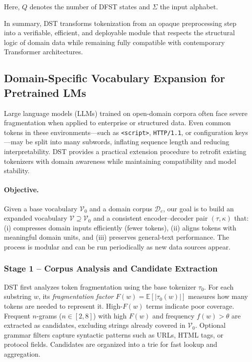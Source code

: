 Here, $Q$ denotes the number of DFST states and $\Sigma$ the input alphabet.

In summary, DST transforms tokenization from an opaque preprocessing step into a verifiable, efficient, and deployable module that respects the structural logic of domain data while remaining fully compatible with contemporary Transformer architectures.

\subsection{Domain-Specific Vocabulary Expansion for Pretrained LMs}
\label{sec:method-dsv}

Large language models (LLMs) trained on open-domain corpora often face severe fragmentation when applied to enterprise or structured data.
Even common tokens in these environments—such as \texttt{<script>}, \texttt{HTTP/1.1}, or configuration keys—may be split into many subwords, inflating sequence length and reducing interpretability.
DST provides a practical extension procedure to retrofit existing tokenizers with domain awareness while maintaining compatibility and model stability.

\paragraph{Objective.}
Given a base vocabulary $\mathcal{V}_0$ and a domain corpus $\mathcal{D}_e$,
our goal is to build an expanded vocabulary $\mathcal{V}\!\supseteq\!\mathcal{V}_0$ and a consistent encoder–decoder pair $(\tau,\kappa)$ that:
(i) compresses domain inputs efficiently (fewer tokens),
(ii) aligns tokens with meaningful domain units, and
(iii) preserves general-text performance.
The process is modular and can be run periodically as new data sources appear.

\subsubsection{Stage 1 – Corpus Analysis and Candidate Extraction}

DST first analyzes token fragmentation using the base tokenizer $\tau_0$.
For each substring $w$, its \emph{fragmentation factor} $F(w)=\mathbb{E}[|\tau_0(w)|]$ measures how many tokens are needed to represent it.
High-$F(w)$ terms indicate poor coverage.
Frequent $n$-grams ($n\!\in\![2,8]$) with high $F(w)$ and frequency $f(w)\!>\!\theta$ are extracted as candidates, excluding strings already covered in $\mathcal{V}_0$.
Optional grammar filters capture syntactic patterns such as URLs, HTML tags, or protocol fields.
Candidates are organized into a trie for fast lookup and aggregation.

